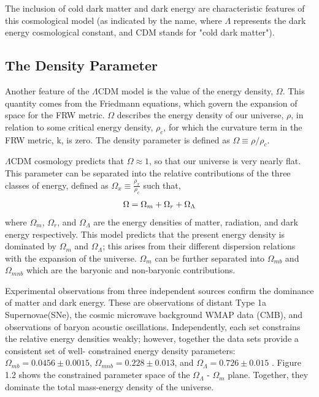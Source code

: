 \documentclass{report}
\begin{document}
The inclusion of cold dark matter and dark energy are characteristic features of this cosmological model (as indicated by the name, where $\Lambda$ represents the dark energy cosmological constant, and CDM stands for "cold dark matter").

\subsection{The Density Parameter}

Another feature of the $\Lambda$CDM model is the value of the energy density, $\Omega$. This quantity comes from the Friedmann equations, which govern the expansion of space for the FRW metric. $\Omega$ describes the energy density of our universe, $\rho$, in relation to some critical energy density, $\rho_c$, for which the curvature term in the FRW metric, k, is zero. The density parameter is defined as $\Omega \equiv \rho/\rho_c$.

$\Lambda$CDM cosmology predicts that $\Omega \approx 1$, so that our universe is very nearly flat. This parameter can be separated into the relative contributions of the three classes of energy, defined as $\Omega_{x} \equiv \frac{\rho_{x}}{\rho_{c}}$  such that,
\begin{eqnarray}
\centering
\Omega = \Omega_{m} + \Omega_{r} + \Omega_{\Lambda}
\end{eqnarray}
where $\Omega_{m}$, $\Omega_{r}$, and $\Omega_{\Lambda}$ are the energy densities of matter, radiation, and dark energy respectively. This model predicts that the present energy density is dominated by $\Omega_{m}$ and $\Omega_{\Lambda}$; this arises from their different dispersion relations with the expansion of the universe. $\Omega_{m}$ can be further separated into $\Omega_{mb}$ and $\Omega_{mnb}$ which are the baryonic and non-baryonic contributions.

Experimental observations from three independent sources confirm the dominance of matter and dark energy. These are observations of distant Type 1a Supernovae(SNe), the cosmic microwave background WMAP data (CMB), and observations of baryon acoustic oscillations. Independently, each set constrains the relative energy densities weakly; however, together the data sets provide a consistent set of well- constrained energy density parameters: $\Omega_{mb} = 0.0456 \pm 0.0015$, $\Omega_{mnb} = 0.228 \pm 0.013$, and $\Omega_{\Lambda} = 0.726 \pm 0.015$ \cite{Komatsu2008}. Figure 1.2 shows the constrained parameter space of the $\Omega_{\Lambda}$ - $\Omega_{m}$ plane. Together, they dominate the total mass-energy density of the universe.
\end{document}
